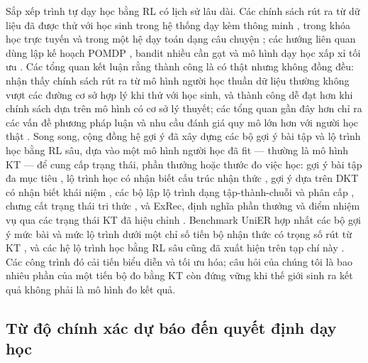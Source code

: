 Sắp xếp trình tự dạy học bằng RL có lịch sử lâu dài. Các chính sách rút ra từ dữ liệu đã được thử với học sinh trong hệ thống dạy kèm thông minh \citep{chi2011umuai,shen2018jedm,zhou2022hrl}, trong khóa học trực tuyến \citep{bassen2020chi} và trong một hệ dạy toán dạng câu chuyện \citep{ruan2024rltutor}; các hướng liên quan dùng lập kế hoạch POMDP \citep{rafferty2016pomdp}, bandit nhiều cần gạt \citep{clement2015bandits} và mô hình dạy học xấp xỉ tối ưu \citep{whitehill2018teaching}. Các tổng quan kết luận rằng thành công là có thật nhưng không đồng đều: \citet{doroudi2019reward} nhận thấy chính sách rút ra từ mô hình người học thuần dữ liệu thường không vượt các đường cơ sở hợp lý khi thử với học sinh, và thành công dễ đạt hơn khi chính sách dựa trên mô hình có cơ sở lý thuyết; các tổng quan gần đây hơn chỉ ra các vấn đề phương pháp luận và nhu cầu đánh giá quy mô lớn hơn với người học thật \citep{singla2021rleducation,riedmann2025rlreview}. Song song, cộng đồng hệ gợi ý đã xây dựng các bộ gợi ý bài tập và lộ trình học bằng RL sâu, dựa vào một mô hình người học đã fit — thường là mô hình KT — để cung cấp trạng thái, phần thưởng hoặc thước đo việc học: gợi ý bài tập đa mục tiêu \citep{huang2019dre}, lộ trình học có nhận biết cấu trúc nhận thức \citep{liu2019cseal}, gợi ý dựa trên DKT có nhận biết khái niệm \citep{ai2019cdkt}, các bộ lập lộ trình dạng tập-thành-chuỗi và phân cấp \citep{chen2023src,li2023gehrl}, chưng cất trạng thái tri thức \citep{li2024pksd}, và ExRec, định nghĩa phần thưởng và điểm nhiệm vụ qua các trạng thái KT đã hiệu chỉnh \citep{ozyurt2025exrec}. Benchmark UniER hợp nhất các bộ gợi ý mức bài và mức lộ trình dưới một chỉ số tiến bộ nhận thức có trọng số rút từ KT \citep{cheng2026unier}, và các hệ lộ trình học bằng RL sâu cũng đã xuất hiện trên tạp chí này \citep{ruan2025adaptive}. Các công trình đó cải tiến biểu diễn và tối ưu hóa; câu hỏi của chúng tôi là bao nhiêu phần của một tiến bộ đo bằng KT còn đứng vững khi thế giới sinh ra kết quả không phải là mô hình đo kết quả.

\subsection{Từ độ chính xác dự báo đến quyết định dạy học}

